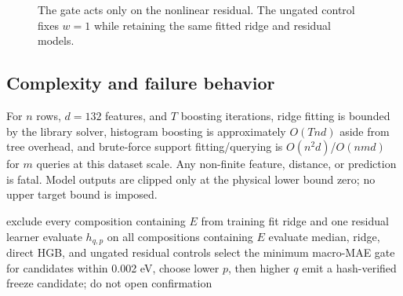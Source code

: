 \documentclass[11pt]{article}
\begin{document}
\begin{figure}[t]
\centering
{}
\caption{The gate acts only on the nonlinear residual. The ungated control fixes
$w=1$ while retaining the same fitted ridge and residual models.}
\label{fig:architecture}
\end{figure}

\subsection{Complexity and failure behavior}
For $n$ rows, $d=132$ features, and $T$ boosting iterations, ridge fitting is
bounded by the library solver, histogram boosting is approximately
$O(Tnd)$ aside from tree overhead, and brute-force support fitting/querying is
$O(n^2d)$/$O(nmd)$ for $m$ queries at this dataset scale. Any non-finite
feature, distance, or prediction is fatal. Model outputs are clipped only at the
physical lower bound zero; no upper target bound is imposed.

\begin{algorithm}[t]
\caption{Frozen development selection}
\begin{algorithmic}[1]
  \State exclude every composition containing $E$ from training
  \State fit ridge and one residual learner
    \State evaluate $h_{q,p}$ on all compositions containing $E$
  \EndFor
  \State evaluate median, ridge, direct HGB, and ungated residual controls
\EndFor
\State select the minimum macro-MAE gate
\State for candidates within 0.002 eV, choose lower $p$, then higher $q$
\State emit a hash-verified freeze candidate; do not open confirmation
\end{algorithmic}
\end{algorithm}
\end{document}
